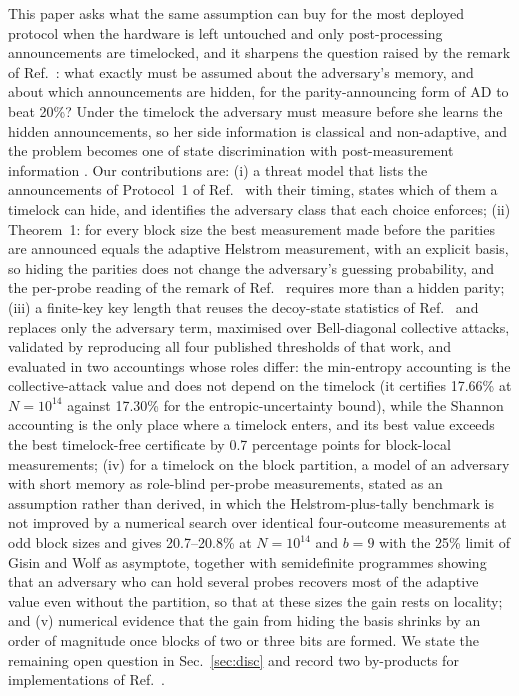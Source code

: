 \documentclass[aps,pra,twocolumn,superscriptaddress,nofootinbib]{revtex4-2}
\begin{document}
This paper asks what the same assumption can buy for the most deployed protocol when the hardware is left untouched and only post-processing announcements are timelocked, and it sharpens the question raised by the remark of Ref.~\cite{BA07}: what exactly must be assumed about the adversary's memory, and about which announcements are hidden, for the parity-announcing form of AD to beat 20\%? Under the timelock the adversary must measure before she learns the hidden announcements, so her side information is classical and non-adaptive, and the problem becomes one of state discrimination with post-measurement information \cite{BWW08,GW10,CHT18}. Our contributions are: (i) a threat model that lists the announcements of Protocol~1 of Ref.~\cite{T25} with their timing, states which of them a timelock can hide, and identifies the adversary class that each choice enforces; (ii) Theorem~1: for every block size the best measurement made before the parities are announced equals the adaptive Helstrom measurement, with an explicit basis, so hiding the parities does not change the adversary's guessing probability, and the per-probe reading of the remark of Ref.~\cite{BA07} requires more than a hidden parity; (iii) a finite-key key length that reuses the decoy-state statistics of Ref.~\cite{T25} and replaces only the adversary term, maximised over Bell-diagonal collective attacks, validated by reproducing all four published thresholds of that work, and evaluated in two accountings whose roles differ: the min-entropy accounting is the collective-attack value and does not depend on the timelock (it certifies 17.66\% at $N=10^{14}$ against 17.30\% for the entropic-uncertainty bound), while the Shannon accounting is the only place where a timelock enters, and its best value exceeds the best timelock-free certificate by 0.7 percentage points for block-local measurements; (iv) for a timelock on the block partition, a model of an adversary with short memory as role-blind per-probe measurements, stated as an assumption rather than derived, in which the Helstrom-plus-tally benchmark is not improved by a numerical search over identical four-outcome measurements at odd block sizes and gives 20.7--20.8\% at $N=10^{14}$ and $b=9$ with the 25\% limit of Gisin and Wolf \cite{GW99} as asymptote, together with semidefinite programmes showing that an adversary who can hold several probes recovers most of the adaptive value even without the partition, so that at these sizes the gain rests on locality; and (v) numerical evidence that the gain from hiding the basis shrinks by an order of magnitude once blocks of two or three bits are formed. We state the remaining open question in Sec.~\ref{sec:disc} and record two by-products for implementations of Ref.~\cite{T25}.
\end{document}

